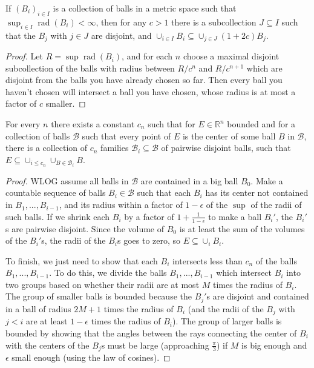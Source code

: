 \documentclass[letterpaper,11pt]{report}
\DeclareMathOperator{\rad}{rad}
\begin{document}
\begin{lem}\label{vitali} If $(B_i)_{i\in I}$ is a collection of balls in a metric space such that $\sup_{i\in I} \rad(B_i) < \infty$, then for any $c > 1$ there is a subcollection $J \subseteq I$ such that the $B_j$ with $j \in J$ are disjoint, and $\cup_{i\in I} B_i \subseteq \cup_{j\in J} (1+2c)B_j$.
\end{lem}
\begin{proof} Let $R = \sup \rad(B_i)$, and for each $n$ choose a maximal disjoint subcollection of the balls with radius between $R/c^n$ and $R/c^{n+1}$ which are disjoint from the balls you have already chosen so far. Then every ball you haven't chosen will intersect a ball you have chosen, whose radius is at most a factor of $c$ smaller.
\end{proof}

\begin{lem}\label{besicovitch} For every $n$ there exists a constant $c_n$ such that for $E \in \mathbb{R}^n$ bounded and for a collection of balls $\mathcal{B}$ such that every point of $E$ is the center of some ball $B$ in $\mathcal{B}$, there is a collection of $c_n$ families $\mathcal{B}_i \subseteq \mathcal{B}$ of pairwise disjoint balls, such that $E \subseteq \cup_{i \le c_n} \cup_{B \in \mathcal{B}_i} B$.
\end{lem}
\begin{proof} WLOG assume all balls in $\mathcal{B}$ are contained in a big ball $B_0$. Make a countable sequence of balls $B_i \in \mathcal{B}$ such that each $B_i$ has its center not contained in $B_1, ..., B_{i-1}$, and its radius within a factor of $1-\epsilon$ of the $\sup$ of the radii of such balls. If we shrink each $B_i$ by a factor of $1+\frac{1}{1-\epsilon}$ to make a ball $B_i'$, the $B_i'$s are pairwise disjoint. Since the volume of $B_0$ is at least the sum of the volumes of the $B_i'$s, the radii of the $B_i$s goes to zero, so $E \subseteq \cup_i B_i$.

To finish, we just need to show that each $B_i$ intersects less than $c_n$ of the balls $B_1, ..., B_{i-1}$. To do this, we divide the balls $B_1, ..., B_{i-1}$ which intersect $B_i$ into two groups based on whether their radii are at most $M$ times the radius of $B_i$. The group of smaller balls is bounded because the $B_j'$s are disjoint and contained in a ball of radius $2M+1$ times the radius of $B_i$ (and the radii of the $B_j$ with $j < i$ are at least $1-\epsilon$ times the radius of $B_i$). The group of larger balls is bounded by showing that the angles between the rays connecting the center of $B_i$ with the centers of the $B_j$s must be large (approaching $\frac{\pi}{3}$) if $M$ is big enough and $\epsilon$ small enough (using the law of cosines).
\end{proof}
\end{document}
